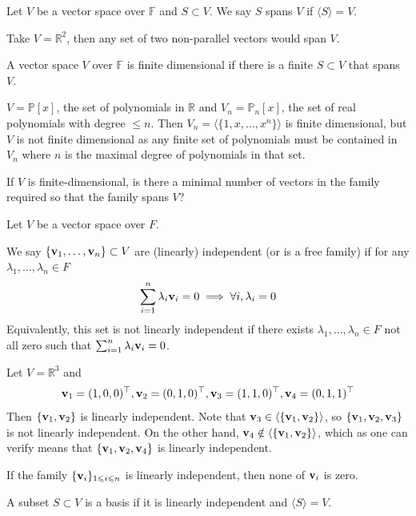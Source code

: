 \documentclass[a4paper,11pt]{article}
\begin{document}
\begin{definition}
    Let $V$ be a vector space over $\mathbb F$ and $S\subset V$.
    We say $S$ spans $V$ if $\langle S\rangle =V$.
\end{definition}
\begin{example}
    Take $V=\mathbb R^2$, then any set of two non-parallel vectors would span $V$.
\end{example}
\begin{definition}
    A vector space $V$ over $\mathbb F$ is finite dimensional if there is a finite $S\subset V$ that spans $V$.
\end{definition}
\begin{example}
    $V=\mathbb P[x]$, the set of polynomials in $\mathbb R$ and $V_n=\mathbb P_n[x]$, the set of real polynomials with degree $\le n$.
    Then $V_n=\langle\{1,x,\ldots,x^n\}\rangle$ is finite dimensional, but $V$ is not finite dimensional as any finite set of polynomials must be contained in $V_n$ where $n$ is the maximal degree of polynomials in that set.
\end{example}
If $V$ is finite-dimensional, is there a minimal number of vectors in the family required so that the family spans $V$?
\begin{definition}
    Let $V$ be a vector space over $F$.

    We say $\{{\bf v}_1,\ldots,{\bf v}_n\}\subset V$ are (linearly) independent (or is a free family) if for any $\lambda_1,\ldots,\lambda_n\in F$
    $$\sum_{i=1}^n\lambda_i{\bf v}_i=0\implies\forall i,\lambda_i=0$$
    Equivalently, this set is not linearly independent if there exists $\lambda_1,\ldots,\lambda_n\in F$ not all zero such that $\sum_{i=1}^n\lambda_i{\bf v}_i=0$.
\end{definition}
\begin{example}
Let $V=\mathbb R^3$ and
$${\bf v}_1=(1,0,0)^\top,{\bf v}_2=(0,1,0)^\top,{\bf v}_3=(1,1,0)^\top,{\bf v}_4=(0,1,1)^\top$$
Then $\{{\bf v}_1,{\bf v}_2\}$ is linearly independent.
Note that ${\bf v}_3\in\langle\{{\bf v}_1,{\bf v}_2\}\rangle$, so $\{{\bf v}_1,{\bf v}_2,{\bf v}_3\}$ is not linearly independent.
On the other hand, ${\bf v}_4\notin\langle\{{\bf v}_1,{\bf v}_2\}\rangle$, which as one can verify means that $\{{\bf v}_1,{\bf v}_2,{\bf v}_4\}$ is linearly independent.
\end{example}
\begin{remark}
    If the family $\{{\bf v}_i\}_{1\leqslant i\leqslant n}$ is linearly independent, then none of ${\bf v}_i$ is zero.
\end{remark}
\begin{definition}[Basis]
    A subset $S\subset V$ is a basis if it is linearly independent and $\langle S\rangle=V$.
\end{definition}
\end{document}
